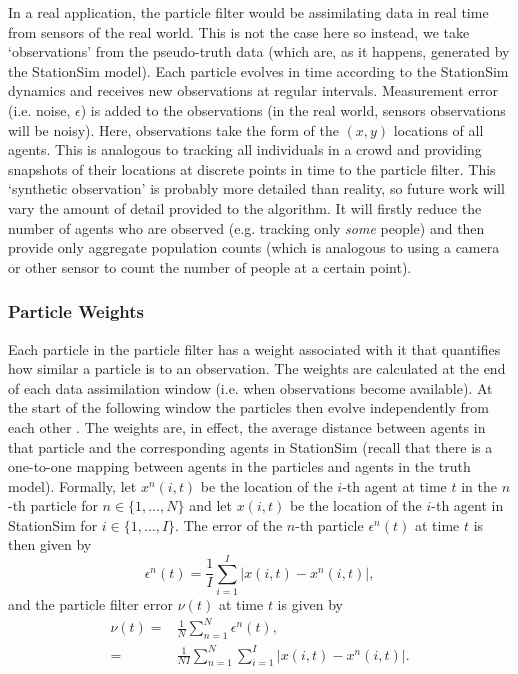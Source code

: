 In a real application, the particle filter would be assimilating data in real time from sensors of the real world. This is not the case here so instead, we take `observations' from the pseudo-truth data (which are, as it happens, generated by the StationSim model). Each particle evolves in time according to the StationSim dynamics and receives new observations at regular intervals. Measurement error (i.e. noise, $\epsilon$) is added to the observations (in the real world, sensors observations will be noisy). Here, observations take the form of the $(x,y)$ locations of all agents. This is analogous to tracking all individuals in a crowd and providing snapshots of their locations at discrete points in time to the particle filter. This `synthetic observation' is probably more detailed than reality, so future work will vary the amount of detail provided to the algorithm. It will firstly reduce the number of agents who are observed (e.g. tracking only \textit{some} people) and then provide only aggregate population counts (which is analogous to using a camera or other sensor to count the number of people at a certain point). 

\subsubsection{Particle Weights}

Each particle in the particle filter has a weight associated with it that quantifies how similar a particle is to an observation. The weights are calculated at the end of each data assimilation window (i.e. when observations become available). At the start of the following window the particles then evolve independently from each other \citep{fearnhead_particle_2018}.  The weights are, in effect, the average distance between agents in that particle and the corresponding agents in StationSim (recall that there is a one-to-one mapping between agents in the particles and agents in the truth model). Formally, let $x^n(i,t)$ be the location of the $i$-th agent at time $t$ in the $n$-th particle for $n \in \{1,\dots,N\}$ and let $x(i,t)$ be the location of the $i$-th agent in StationSim for $i \in \{1,\dots,I\}$. The error of the $n$-th particle $\epsilon^n(t)$ at time $t$ is then given by
\begin{equation}
\epsilon^n(t) = \frac{1}{I} \sum_{i=1}^I |x(i,t) - x^n(i,t)|,
\end{equation}
and the particle filter error $\nu(t)$ at time $t$ is given by
\begin{equation}
\label{eqn:particle_error}
\begin{split}
\nu(t) =& \frac{1}{N} \sum_{n=1}^{N} \epsilon^n(t), \\
=& \frac{1}{NI} \sum_{n=1}^{N}\sum_{i=1}^I |x(i,t) - x^n(i,t)|.
\end{split}
\end{equation}

